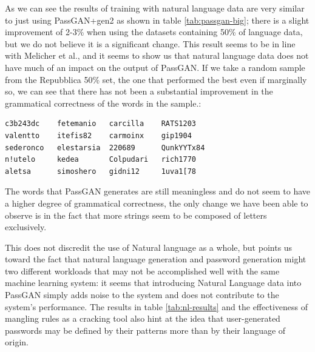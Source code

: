 As we can see the results of training with natural language data are very similar to just using PassGAN+gen2 as shown in table \ref{tab:passgan-big}; there is a slight improvement of 2-3\% when using the datasets containing 50\% of language data, but we do not believe it is a significant change. This result seems to be in line with Melicher et al.\cite{Melicher2016}, and it seems to show us that natural language data does not have much of an impact on the output of PassGAN. 
If we take a random sample from the Repubblica 50\% set, the one that performed the best even if marginally so, we can see that there has not been a substantial improvement in the grammatical correctness of the words in the sample.:
\begin{verbatim}
c3b243dc    fetemanio   carcilla    RATS1203
valentto    itefis82    carmoinx    gip1904
sederonco   elestarsia  220689      QunkYYTx84
n!utelo     kedea       Colpudari   rich1770
aletsa      simoshero   gidni12     1uva1[78
\end{verbatim}    

The words that PassGAN generates are still meaningless and do not seem to have a higher degree of grammatical correctness, the only change we have been able to observe is in the fact that more strings seem to be composed of letters exclusively.

This does not discredit the use of Natural language as a whole, but points us toward the fact that natural language generation and password generation might two different workloads that may not be accomplished well with the same machine learning system: it seems that introducing Natural Language data into PassGAN simply adds noise to the system and does not contribute to the system's performance.
The results in table \ref{tab:nl-results} and the effectiveness of mangling rules as a cracking tool also hint at the idea that user-generated passwords may be defined by their patterns more than by their language of origin.


